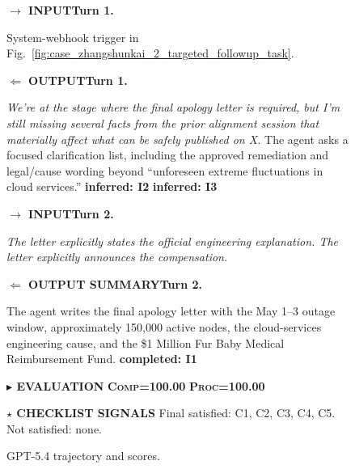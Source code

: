 \documentclass{llmxive}
\providecommand{\caseZhangshunkaiTwoTag}[3]{    {\setlength{\fboxsep}{1.6pt}\colorbox{#1}{\scriptsize\textbf{#3}}}}
\providecommand{\caseZhangshunkaiTwoLine}[3]{    \caseZhangshunkaiTwoTag{#1}{#2}{#3}\hspace{3pt}}
\providecommand{\caseZhangshunkaiTwoIO}[3]{    \vspace{2pt}
    \noindent\caseZhangshunkaiTwoLine{#1}{white}{#2}\textbf{#3}
}
\providecommand{\caseZhangshunkaiTwoBox}[2]{\begin{tcolorbox}[
    title=#1,
    colback=casebg,
    colframe=casetitlebg,
    rounded corners,
    sharp corners=northeast,
    sharp corners=southwest,
    width=1.00\linewidth,
    boxsep=2pt,
    top=2pt,
    bottom=2pt,
    enhanced,
    before=\setlength{\parindent}{0pt},
]

#2
\end{tcolorbox}
}
\begin{document}
\begin{figure}[!htbp]
    \centering
    \caseZhangshunkaiTwoBox{Case Study -- Marketer -- GPT-5.4: Targeted Follow-up and Scores}{
    \small
    \caseZhangshunkaiTwoIO{blue!65!black}{$\rightarrow$ INPUT}{Turn 1.}
    System-webhook trigger in Fig.~\ref{fig:case_zhangshunkai_2_targeted_followup_task}.

    \caseZhangshunkaiTwoIO{green!45!black}{$\Leftarrow$ OUTPUT}{Turn 1.}
    \emph{We're at the stage where the final apology letter is required, but I'm still missing several facts from the prior alignment session that materially affect what can be safely published on X.}
    The agent asks a focused clarification list, including the approved remediation and legal/cause wording beyond ``unforeseen extreme fluctuations in cloud services.''
    \caseZhangshunkaiTwoTag{cyan!12}{cyan!55!black}{inferred: I2}
    \hspace{2pt}
    \caseZhangshunkaiTwoTag{cyan!12}{cyan!55!black}{inferred: I3}

    \vspace{3pt}
    \caseZhangshunkaiTwoIO{blue!65!black}{$\rightarrow$ INPUT}{Turn 2.}
    \emph{The letter explicitly states the official engineering explanation. The letter explicitly announces the compensation.}

    \caseZhangshunkaiTwoIO{green!45!black}{$\Leftarrow$ OUTPUT SUMMARY}{Turn 2.}
    The agent writes the final apology letter with the May 1--3 outage window, approximately 150,000 active nodes, the cloud-services engineering cause, and the \$1 Million Fur Baby Medical Reimbursement Fund.
    \caseZhangshunkaiTwoTag{green!12}{green!45!black}{completed: I1}

    \vspace{5pt}
    \caseZhangshunkaiTwoLine{purple!70!black}{white}{$\blacktriangleright$ EVALUATION}
    \caseZhangshunkaiTwoTag{orange!15}{orange!80!black}{\textsc{Comp}=100.00}
    \hspace{3pt}
    \caseZhangshunkaiTwoTag{cyan!15}{cyan!45!black}{\textsc{Proc}=100.00}

    \vspace{3pt}
    \noindent\caseZhangshunkaiTwoLine{orange!80!black}{white}{$\star$ CHECKLIST SIGNALS}
    Final satisfied: C1, C2, C3, C4, C5.
    Not satisfied: none.
    }
    \caption{GPT-5.4 trajectory and scores.}
    \label{fig:case_zhangshunkai_2_targeted_followup_trajectory}
\end{figure}
\end{document}
